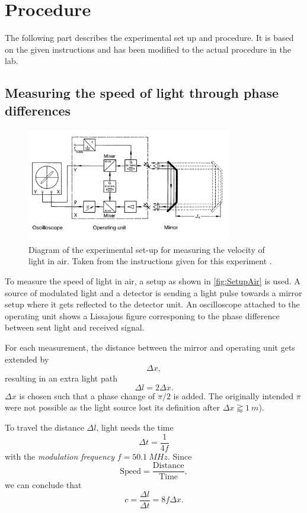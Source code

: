 \section{Procedure}
\label{sec:procedure}
The following part describes the experimental set up and procedure. It is based on the given
instructions and has been modified to the actual procedure in the lab.

\subsection{Measuring the speed of light through phase differences}
\label{sec:measuring}
\begin{figure}
    \centering
    \includegraphics[width=0.8\textwidth]{media/Setup Air.png}
    \caption{Diagram of the experimental set-up for measuring the velocity of light in air. Taken
      from the instructions given for this experiment \cite{LabInstructions}.}
    \label{fig:SetupAir}
\end{figure}
To measure the speed of light in air, a setup as shown in \autoref{fig:SetupAir} is used. A source
of modulated light and a detector is sending a light pulse towards a mirror setup where it gets
reflected to the detector unit. An oscilloscope attached to the operating unit shows a Lissajous
figure corresponing to the phase difference between sent light and received signal.

For each measurement, the distance between the mirror and operating unit gets extended by
\[
\Delta x,
\]
resulting in an extra light path
\[
  \Delta l = 2 \Delta x.
\]
$\Delta x$ is chosen such that a phase change of $\pi / 2$ is added. The originally intended $\pi$
were not possible as the light source lost its definition after $\Delta x \gtrapprox \SI{1}{m}$).

To travel the distance $\Delta l$, light needs the time
\[
  \Delta t = \frac{1}{4f}
\]
with the \textit{modulation frequency} $f = \SI{50.1}{MHz}$. Since
\[
  \text{Speed} = \frac{\text{Distance}}{\text{Time}},
\]
we can conclude that
\begin{equation}
  c = \frac{\Delta l}{\Delta t} = 8f \Delta x.
  \label{eqn:speedoflight}
\end{equation}

